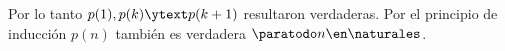 Por lo tanto $p(1), p(k) \ytext p(k+1)$ resultaron verdaderas. Por el principio de inducción $p(n)$ también es verdadera $\paratodo n \en \naturales$.

\begin{aportes}
  \item {}
\end{aportes}
